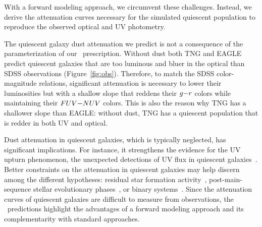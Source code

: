 With a forward modeling approach, we circumvent these challenges. 
Instead, we derive the attenuation curves necessary for the simulated quiescent population to reproduce the observed optical and UV photometry. 


The quiescent galaxy dust attenuation we predict is not a consequence of
the parameterization of our \eda~prescription. 
Without dust both TNG and EAGLE predict quiescent galaxies that are too
luminous and bluer in the optical than SDSS observations (Figure~\ref{fig:obs}). 
Therefore, to match the SDSS color-magnitude relations, significant
attenuation is necessary to lower their luminosities but with a shallow
slope that reddens their $g{-}r$ colors while maintaining their $FUV{-}NUV$ colors.
This is also the reason why TNG has a shallower slope than EAGLE: without
dust, TNG has a quiescent population that is redder in both UV and optical.   

Dust attenuation in quiescent galaxies, which is typically neglected, has
significant implications.  
For instance, it strengthens the evidence for the UV upturn phenomenon, the
unexpected detections of UV flux in quiescent galaxies~\citep[\eg][]{code1969,
oconnell1999, lecras2016, ali2018, dantas2021}. 
Better constraints on the attenuation in quiescent galaxies may help
discern among the different hypotheses: residual star formation activity~\citep[\eg~][]{kaviraj2007}, post-main-sequence stellar
evolutionary phases~\citep[\eg~][]{yi1997}, or binary systems~\citep[\eg~][]{han2007}.
Since the attenuation curves of quiescent galaxies are difficult to measure
from observations, the \eda~predictions highlight the advantages of a
forward modeling approach and its complementarity with standard approaches. 

